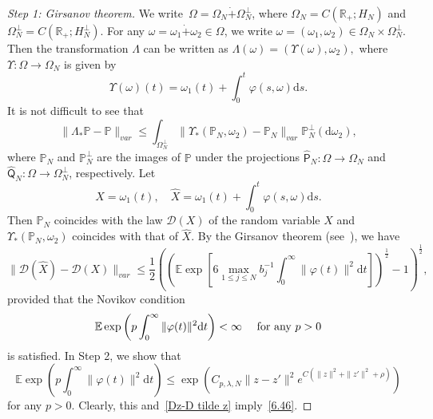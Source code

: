 \documentclass[AHL,Unicode,longabstracts]{cedram}
\newcommand{\ph}{\varphi}
\newcommand{\R}{{\mathbb R}}
\newcommand{\pP}{{\mathbb P}}
\newcommand{\E}{{\mathbb E}}
\newcommand{\DD}{{\mathcal D}}
\newcommand{\ty}{\infty}
\newcommand{\om}{\omega}
\newcommand{\dt}{\dot}
\newcommand{\dd}{\mathrm{d}}
\newenvironment{step}{\begin{proof}}{\let\qed\relax \end{proof}}
\begin{document}
\goodbreak
\begin{proofc}

\begin{step}[Step 1: Girsanov theorem]
We write~$ \Omega=\Omega_N\dt+\Omega_N^{\perp}$, where $\Omega_N=C(\R_+; H_N)$ and $\Omega_N^\perp=C(\R_+; { H^\perp_N})$. For any $\om=\om_{1}\dt+\om_{2}\in \Omega$, we write $\om=(\om_{1},\om_{2})\in \Omega_N\times \Omega_N^{\perp}$. Then the transformation $\Lambda$ can be written as $\Lambda(\om)=(\Upsilon(\omega),\om_{2}), $ where $\Upsilon:\Omega\to\Omega_N$ is given by
\[
\Upsilon(\om)(t)=\om_{1}(t)+\int_0^t \ph(s,\om)\dd s.
\]
It is not difficult to see that
\[
\|\Lambda_*\pP-\pP\|_{var}\leq\int_{\Omega^\perp_N}\|\Upsilon_*(\pP_N,\om_{2})-\pP_N\|_{var}\pP^\perp_N(\dd\om_{2}),
\]
where $\pP_N$ and $\pP^\perp_N$ are the images of $\pP$ under the projections $\hat {\mathsf P}_N:\Omega\to\Omega_N$ and $\hat {\mathsf Q}_N:\Omega\to\Omega^\perp_N$, respectively. Let
\[
X=\om_{1}(t),\quad
\hat X=\om_{1}(t)+\int_0^t \ph(s,\om)\dd s.
\]
Then $\pP_N$ coincides with the law $\DD(X)$ of the random variable $X$ and~$\Upsilon_*(\pP_N,\om_{2})$ coincides with that of $\hat X$. By the Girsanov theorem (see~\cite[Theorem~A.10.1]{KS-book}), we have
\begin{equation}\label{Dz-D tilde z}
\|\DD(\hat X)-\DD(X)\|_{var}\leq\frac{1}{2}\left(\left(\E\exp\left[6\max_{1\leq j\leq N} b_j^{-1}\int_0^\infty \|\varphi(t)\|^2\dd t\right]\right)^{\frac{1}{2}}-1\right)^{\frac{1}{2}},
\end{equation}
provided that the Novikov condition
\[
\E \exp\left(p\int_0^\ty \|\ph(t)\|^2 \dd t \right)<\infty \quad \text{ for any $ p>0$}
\]
is satisfied. In Step 2, we show that
\begin{equation}\label{novikov}
\E \exp\left(p\int_0^\ty \|\ph(t)\|^2 \dd t \right)\le \exp\left(C_{p,\lambda, N} \|z-z'\|^2 e^{C(\|z\|^2+\|z'\|^2+\rho)} \right)
\end{equation}
for any $ p>0$. Clearly, this and~\eqref{Dz-D tilde z} imply~\eqref{6.46}.
\end{step}


\end{proofc}
\end{document}
